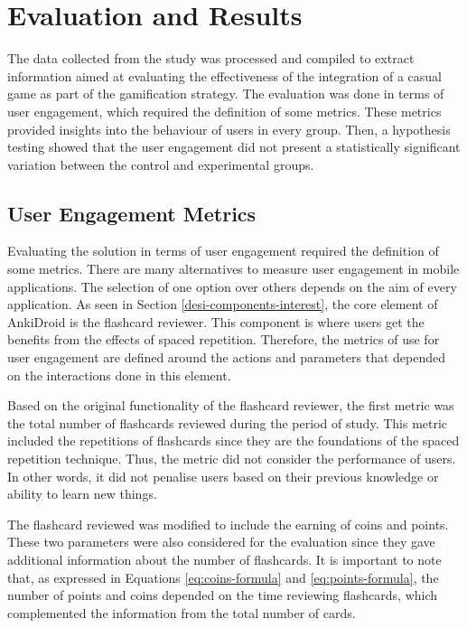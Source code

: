 
\chapter{Evaluation and Results} %

\label{resu} %

The data collected from the study was processed and compiled to extract information aimed at evaluating the effectiveness of the integration of a casual game as part of the gamification strategy. The evaluation was done in terms of user engagement, which required the definition of some metrics. These metrics provided insights into the behaviour of users in every group. Then, a hypothesis testing showed that the user engagement did not present a statistically significant variation between the control and experimental groups.

\section{User Engagement Metrics}
Evaluating the solution in terms of user engagement required the definition of some metrics. There are many alternatives to measure user engagement in mobile applications. The selection of one option over others depends on the aim of every application. As seen in Section \ref{desi-components-interest}, the core element of AnkiDroid is the flashcard reviewer. This component is where users get the benefits from the effects of spaced repetition. Therefore, the metrics of use for user engagement are defined around the actions and parameters that depended on the interactions done in this element.

Based on the original functionality of the flashcard reviewer, the first metric was the total number of flashcards reviewed during the period of study. This metric included the repetitions of flashcards since they are the foundations of the spaced repetition technique. Thus, the metric did not consider the performance of users. In other words, it did not penalise users based on their previous knowledge or ability to learn new things.

The flashcard reviewed was modified to include the earning of coins and points. These two parameters were also considered for the evaluation since they gave additional information about the number of flashcards. It is important to note that, as expressed in Equations \ref{eq:coins-formula} and \ref{eq:points-formula}, the number of points and coins depended on the time reviewing flashcards, which complemented the information from the total number of cards.

